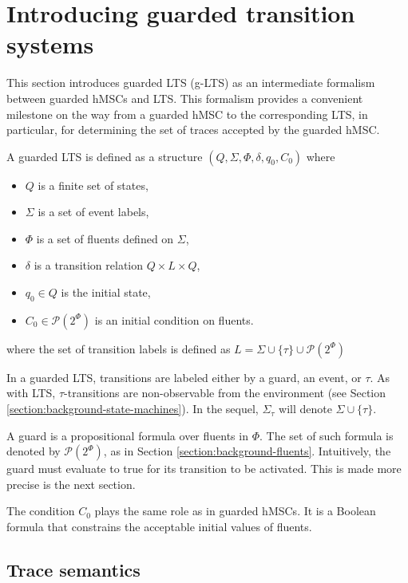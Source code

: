 \section{Introducing guarded transition systems\label{section:deductive-glts}}

This section introduces guarded LTS (g-LTS) as an intermediate formalism between guarded hMSCs and LTS. This formalism provides a convenient milestone on the way from a guarded hMSC to the corresponding LTS, in particular, for determining the set of traces accepted by the guarded hMSC. 

\begin{definition}
\noindent A guarded LTS is defined as a structure $(Q,\Sigma,\Phi,\delta,q_{0},C_{0})$ where 
\begin{itemize}
\item $Q$ is a finite set of states,
\item $\Sigma$ is a set of event labels, 
\item $\Phi$ is a set of fluents defined on $\Sigma$,
\item $\delta$ is a transition relation $Q \times L \times Q$,
\item $q_{0} \in Q$ is the initial state,
\item $C_{0} \in \mathcal{P}(2^\Phi)$ is an initial condition on fluents.
\end{itemize}
where the set of transition labels is defined as $L = \Sigma \cup \{\tau\} \cup \mathcal{P}(2^\Phi)$ 
\end{definition}

In a guarded LTS, transitions are labeled either by a guard, an event, or $\tau$. As with LTS, $\tau$-transitions are non-observable from the environment (see Section \ref{section:background-state-machines}). In the sequel, $\Sigma_{\tau}$ will denote $\Sigma \cup \{\tau\}$.

A guard is a propositional formula over fluents in $\Phi$. The set of such formula is denoted by $\mathcal{P}(2^\Phi)$, as in Section \ref{section:background-fluents}. Intuitively, the guard must evaluate to true for its transition to be activated. This is made more precise is the next section.

The condition $C_0$ plays the same role as in guarded hMSCs. It is a Boolean formula that constrains the acceptable initial values of fluents. 

\subsection{Trace semantics\label{subsection:glts-trace-semantics}} 

